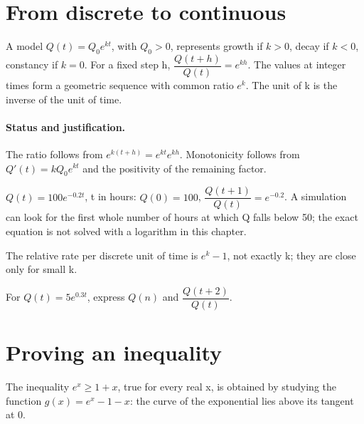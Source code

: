 \section{From discrete to continuous}\label{C09-U4}
\begin{keypoint}
A model $Q(t)=Q_0e^{kt}$, with $Q_0>0$, represents growth if $k>0$, decay if $k<0$, constancy if $k=0$. For a fixed step h, $\dfrac{Q(t+h)}{Q(t)}=e^{kh}$. The values at integer times form a geometric sequence with common ratio $e^k$. The unit of k is the inverse of the unit of time.
\end{keypoint}
\paragraph{Status and justification.} The ratio follows from $e^{k(t+h)}=e^{kt}e^{kh}$. Monotonicity follows from $Q\prime(t)=kQ_0e^{kt}$ and the positivity of the remaining factor.
\begin{example}$Q(t)=100e^{-\num{0,2}t}$, t in hours: $Q(0)=100$, $\dfrac{Q(t+1)}{Q(t)}=e^{-\num{0,2}}$. A simulation can look for the first whole number of hours at which Q falls below 50; the exact equation is not solved with a logarithm in this chapter.\end{example}\label{C09-EX4}
\begin{pitfall}The relative rate per discrete unit of time is $e^k-1$, not exactly k; they are close only for small k.\end{pitfall}
\begin{application}For $Q(t)=5e^{\num{0,3}t}$, express $Q(n)$ and $\dfrac{Q(t+2)}{Q(t)}$.\end{application}\label{C09-AP4}
\section{Proving an inequality}\label{C09-U5}
\begin{keypoint}
The inequality $e^x\geq1+x$, true for every real x, is obtained by studying the function $g(x)=e^x-1-x$: the curve of the exponential lies above its tangent at 0.
\end{keypoint}

